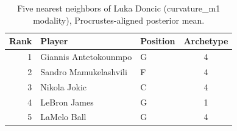 \begin{table}[htbp]
  \centering\small
  \begin{tabular}{rllc}
    \toprule
    Rank & Player & Position & Archetype \\
    \midrule
    1 & Giannis Antetokounmpo & G & 4 \\
    2 & Sandro Mamukelashvili & F & 4 \\
    3 & Nikola Jokic & C & 4 \\
    4 & LeBron James & G & 1 \\
    5 & LaMelo Ball & G & 4 \\
    \bottomrule
  \end{tabular}
  \caption{Five nearest neighbors of Luka Doncic (curvature_m1 modality), Procrustes-aligned posterior mean.}
  \label{tab:Luka_Doncic_neighbors_curvature_m1}
\end{table}

